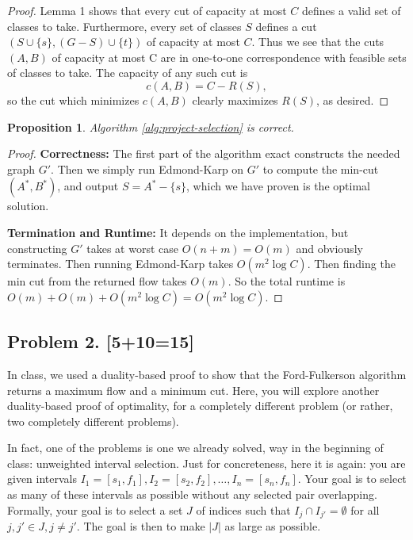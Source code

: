 \documentclass[10pt]{article}
\newtheorem{proposition}[lemma]{Proposition}
\begin{document}
\begin{proof}
  Lemma 1 shows that every cut of capacity at most \(C\) defines a valid set of classes to take. Furthermore, every set of classes \(S\) defines a cut \((S \cup \{s\}, (G - S) \cup \{t\})\) of capacity at most \(C\). Thus we see that the cuts \((A, B)\) of capacity at most C are in one-to-one correspondence with feasible sets of classes to take. The capacity of any such cut is 
  \[c(A, B) = C - R(S),\]
  so the cut which minimizes \(c(A, B)\) clearly maximizes \(R(S)\), as desired.
\end{proof}

\begin{proposition}
  Algorithm \ref{alg:project-selection} is correct.
\end{proposition}

\begin{proof}
  \textbf{Correctness:} The first part of the algorithm exact constructs the needed graph \(G'\). Then we simply run Edmond-Karp on \(G'\) to compute the min-cut \((A^*, B^*)\), and output \(S = A^* - \{s\}\), which we have proven is the optimal solution.

  \textbf{Termination and Runtime:} It depends on the implementation, but constructing \(G'\) takes at worst case \(O(n + m) = O(m)\) and obviously terminates. Then running Edmond-Karp takes \(O(m^2 \log C)\). Then finding the min cut from the returned flow takes \(O(m)\). So the total runtime is \(O(m) + O(m) + O(m^2 \log C) = O(m^2 \log C)\).
\end{proof}

\newpage
\subsection*{Problem 2. [5+10=15]}
  In class, we used a duality-based proof to show that the Ford-Fulkerson algorithm returns a maximum flow and a minimum cut. Here, you will explore another duality-based proof of optimality, for a completely different problem (or rather, two completely different problems).

  In fact, one of the problems is one we already solved, way in the beginning of class: unweighted interval selection.
  Just for concreteness, here it is again: you are given intervals $I_1 = [s_1, f_1], I_2 = [s_2, f_2], \ldots, I_n = [s_n, f_n]$. Your goal is to select as many of these intervals as possible without any selected pair overlapping. Formally, your goal is to select a set $J$ of indices such that $I_j \cap I_{j'} = \emptyset$ for all $j, j' \in J, j \neq j'$. The goal is then to make $|J|$ as large as possible.
\end{document}
